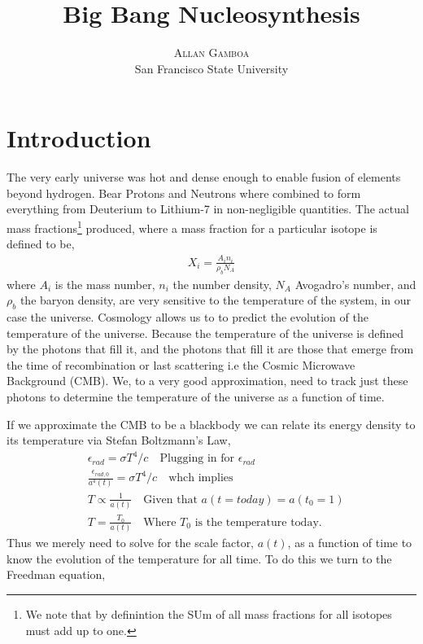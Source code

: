 \documentclass[twoside]{article}
\title{\vspace{-15mm}\fontsize{24pt}{10pt}\selectfont\textbf{Big Bang Nucleosynthesis}} %
\author{
\large
\textsc{Allan Gamboa}\\ %
\normalsize San Francisco State University
\vspace{-5mm}
}
\date{}
\begin{document}
\maketitle %

\thispagestyle{fancy} %

\section{Introduction}
The very early universe  was hot and dense enough to enable fusion of elements beyond hydrogen. Bear Protons and Neutrons where combined to form everything from Deuterium to Lithium-7 in non-negligible quantities. The actual mass fractions\footnote{We note that by definintion the SUm of all mass fractions for all isotopes must add up to one.} produced, where a mass fraction for a particular isotope is defined to be,
\begin{align}
X_{i} = \frac{A_{i}n_{i}}{\rho_{b}N_{A}}
\end{align}
where $A_{i}$ is the mass number, $n_{i}$ the number density, $N_{A}$ Avogadro's number, and $\rho_{b}$ the baryon density, are very sensitive to the temperature of the system, in our case the universe.
Cosmology allows us to to predict the evolution of the temperature of the universe. Because the temperature of the universe is defined by the photons that  fill it, and the photons that fill it are those that emerge from the time of recombination or last scattering i.e the Cosmic Microwave Background (CMB). We, to a very good approximation, need to track just these photons to determine the temperature of the universe as a function of time. \par 
If we approximate the CMB to be a blackbody we can relate its energy density to its temperature via  Stefan Boltzmann's Law,
\begin{align}
&\epsilon_{rad} = \sigma T^{4}/c\quad\text{Plugging in for $\epsilon_{rad}$}\\
&\frac{\epsilon_{rad,0}}{a^{4}(t)} = \sigma T^{4}/c\quad\text{whch implies}\\
&T\propto\frac{1}{a(t)} \quad\text{Given that $a(t=today)=a(t_{0}=1)$}\\
&T=\frac{T_{0}}{a(t)} \quad\text{Where $T_{0}$ is the temperature today.}\label{eq:tofa}
\end{align}
Thus we merely need to solve for the scale factor, $a(t)$, as a function of time to know the evolution of the temperature for all time. To do this we turn to the Freedman equation,
\end{document}
